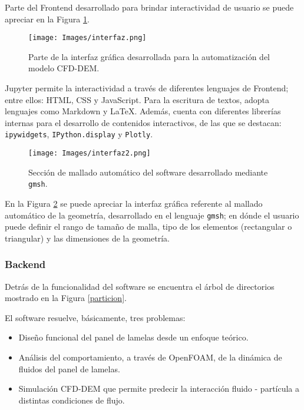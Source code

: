Parte del Frontend desarrollado para brindar interactividad de usuario se puede apreciar en la Figura \ref{interfaz}.

\begin{figure}[h!]
	\centering
	\texttt{[image: Images/interfaz.png]}
	\caption{Parte de la interfaz gr\'afica desarrollada para la automatizaci\'on del modelo CFD-DEM.}
	\label{interfaz}
\end{figure}

\noindent
\justify


Jupyter permite la interactividad a trav\'es de diferentes lenguajes de Frontend; entre ellos: HTML, CSS y JavaScript. Para la escritura de textos, adopta lenguajes como Markdown y \LaTeX. Adem\'as, cuenta con diferentes librer\'ias internas para el desarrollo de contenidos interactivos, de las que se destacan: \texttt{ipywidgets}, \texttt{IPython.display} y \texttt{Plotly}. 

\begin{figure}[h!]
	\centering
	\texttt{[image: Images/interfaz2.png]}
	\caption{Secci\'on de mallado autom\'atico del software desarrollado mediante \texttt{gmsh}.}
	\label{mallado:gmsh}
\end{figure}

\noindent
\justify

En la Figura \ref{mallado:gmsh} se puede apreciar la interfaz gr\'afica referente al mallado autom\'atico de la geometr\'ia, desarrollado en el lenguaje \texttt{gmsh}; en d\'onde el usuario puede definir el rango de tama\~no de malla, tipo de los elementos (rectangular o triangular) y las dimensiones de la geometr\'ia.

\newpage

\subsubsection{Backend}

\noindent
\justify

Detr\'as de la funcionalidad del software se encuentra el \'arbol de directorios mostrado en la Figura \ref{particion}.



\newpage

\noindent
\justify

El software resuelve, b\'asicamente, tres problemas:

\begin{itemize}
	\item Dise\~no funcional del panel de lamelas desde un enfoque te\'orico.
	\item An\'alisis del comportamiento, a trav\'es de OpenFOAM, de la din\'amica de fluidos del panel de lamelas.
	\item Simulaci\'on CFD-DEM que permite predecir la interacci\'on fluido - part\'icula a distintas condiciones de flujo.
\end{itemize}

